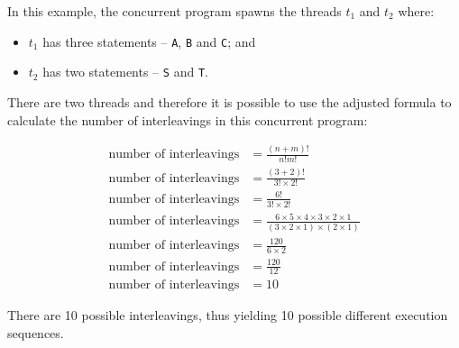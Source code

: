 \documentclass[a4paper]{systems-software}
\begin{document}
In this example, the concurrent program spawns the threads $t_{1}$ and $t_{2}$ where:
\begin{itemize}
	\item $t_{1}$ has three statements -- \texttt{A}, \texttt{B} and \texttt{C}; and
	\item $t_{2}$ has two statements -- \texttt{S} and \texttt{T}.
\end{itemize}

There are two threads and therefore it is possible to use the adjusted formula to calculate the number of interleavings in this concurrent program:

\begin{equation*}
	\begin{aligned}
		\text{number of interleavings} & = \frac{(n + m)!}{n!m!} \\
		\text{number of interleavings} & = \frac{(3 + 2)!}{3! \times 2!} \\
		\text{number of interleavings} & = \frac{6!}{3! \times 2!} \\
		\text{number of interleavings} & = \frac{6\times5\times4\times3\times2\times1}{(3\times2\times1)\times(2\times1)} \\
		\text{number of interleavings} & = \frac{120}{6\times2} \\
		\text{number of interleavings} & = \frac{120}{12} \\
		\text{number of interleavings} & = 10
	\end{aligned}
\end{equation*}

There are 10 possible interleavings, thus yielding 10 possible different execution sequences.
\end{document}
